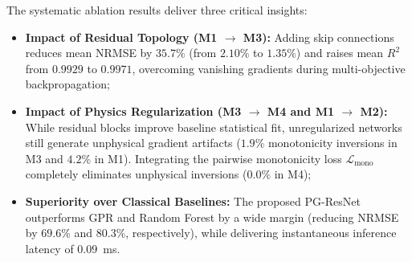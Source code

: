 \documentclass[preprint,12pt,3p]{elsarticle}
\begin{document}
\begin{table}[htb]
  \centering
  \caption{Systematic 4-model ablation matrix under 10-fold cross-validation ($K = 10$) and comparative baseline benchmark ($N = 250$).}
  \label{tab:model_comparison}
  \small
\end{table}

The systematic ablation results deliver three critical insights:
\begin{itemize}
  \item \textbf{Impact of Residual Topology (M1 $\to$ M3):} Adding skip connections reduces mean NRMSE by $35.7\%$ (from $2.10\%$ to $1.35\%$) and raises mean $R^2$ from $0.9929$ to $0.9971$, overcoming vanishing gradients during multi-objective backpropagation;
  \item \textbf{Impact of Physics Regularization (M3 $\to$ M4 and M1 $\to$ M2):} While residual blocks improve baseline statistical fit, unregularized networks still generate unphysical gradient artifacts ($1.9\%$ monotonicity inversions in M3 and $4.2\%$ in M1). Integrating the pairwise monotonicity loss $\mathcal{L}_{\text{mono}}$ completely eliminates unphysical inversions ($\mathbf{0.0\%}$ in M4);
  \item \textbf{Superiority over Classical Baselines:} The proposed PG-ResNet outperforms GPR and Random Forest by a wide margin (reducing NRMSE by $69.6\%$ and $80.3\%$, respectively), while delivering instantaneous inference latency of $0.09$~ms.
\end{itemize}
\end{document}
